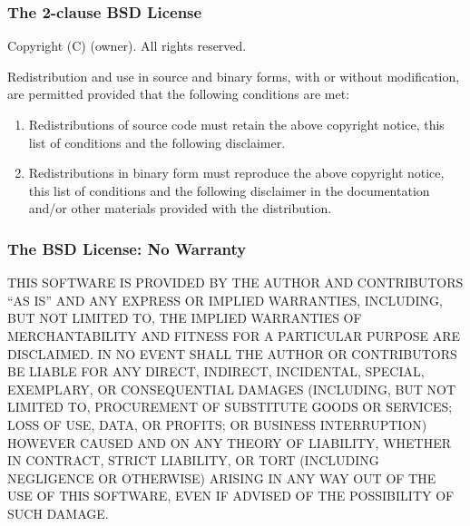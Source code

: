 
\begin{frame}
\frametitle{The 2-clause BSD License}

Copyright (C) (owner). All rights reserved.

Redistribution and use in source and binary forms, with or without
modification, are permitted provided that the following conditions
are met:

\begin{enumerate}
\item Redistributions of source code must retain the above copyright notice, this list of  conditions and the following disclaimer.
\item Redistributions in binary form must reproduce the above copyright notice, this list of conditions and the following disclaimer in the documentation and/or other materials provided with the distribution.
\end{enumerate}
 
\end{frame}


\begin{frame}
\frametitle{The BSD License: No Warranty}

{\small
THIS SOFTWARE IS PROVIDED BY THE AUTHOR AND CONTRIBUTORS ``AS IS'' 
AND ANY EXPRESS OR IMPLIED WARRANTIES, INCLUDING, BUT NOT LIMITED TO, 
THE IMPLIED WARRANTIES OF MERCHANTABILITY AND FITNESS FOR A PARTICULAR 
PURPOSE ARE DISCLAIMED. IN NO EVENT SHALL THE AUTHOR OR CONTRIBUTORS 
BE LIABLE FOR ANY DIRECT, INDIRECT, INCIDENTAL, SPECIAL, EXEMPLARY, 
OR CONSEQUENTIAL DAMAGES (INCLUDING, BUT NOT LIMITED TO, PROCUREMENT 
OF SUBSTITUTE GOODS OR SERVICES; LOSS OF USE, DATA, OR PROFITS; 
OR BUSINESS INTERRUPTION) HOWEVER CAUSED AND ON ANY THEORY OF LIABILITY, 
WHETHER IN CONTRACT, STRICT LIABILITY, OR TORT (INCLUDING NEGLIGENCE 
OR OTHERWISE) ARISING IN ANY WAY OUT OF THE USE OF THIS SOFTWARE, 
EVEN IF ADVISED OF THE POSSIBILITY OF SUCH DAMAGE.
}

\end{frame}



